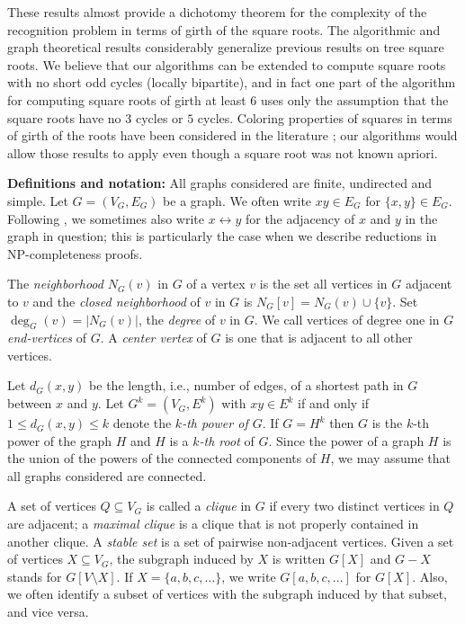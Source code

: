 \documentclass[proceedings]{stacs}
\newlength{\ai}
\begin{document}
These results almost provide a dichotomy theorem for the complexity
of the recognition problem in terms of girth of the square roots.
The algorithmic and graph theoretical results considerably
generalize previous results on tree square roots.
We believe that our algorithms can be extended to
compute square roots with no short odd cycles (locally bipartite),
and in fact one part of the algorithm for computing square
roots of girth at least $6$ uses only the assumption that
the square roots have no $3$ cycles or $5$ cycles.
Coloring properties of squares in terms of girth of the roots
have been considered in the literature \cite{AloMoh,CraKim,Havet};
our algorithms would allow those results to apply even
though a square root was not known apriori.

{\bf Definitions and notation:}
All graphs considered are finite, undirected and simple. Let $G=(V_G, E_G)$ be a graph.
We often write $xy\in E_G$ for $\{x,y\}\in E_G$. Following \cite{MotSud1994,LauCor2004}, we sometimes
also write $x\leftrightarrow y$ for the adjacency of $x$ and $y$ in the graph in question; this
is particularly the case when we describe reductions in NP-completeness proofs.

The \emph{neighborhood} $N_G(v)$ in $G$
of a vertex $v$ is the set all vertices in $G$ adjacent to $v$ and the
\emph{closed neighborhood} of $v$ in $G$ is $N_G[v] = N_G(v)\cup\{v\}$. Set $\deg_G(v)=|N_G(v)|$,
the \emph{degree} of $v$ in $G$. We call vertices of degree one in $G$ \emph{end-vertices}
of $G$. A \emph{center vertex} of $G$ is one that is adjacent to all other vertices.

Let $d_G(x,y)$ be the length, i.e., number of edges, of a shortest path in $G$ between
$x$ and $y$. Let $G^k=(V_G,E^k)$ with $xy \in E^k$ if and only if $1\le d_G(x,y) \le k$ denote
the {\em $k$-th power of $G$}. If $G=H^k$ then $G$ is the $k$-th power of the graph $H$ and
$H$ is a \emph{$k$-th root} of $G$. Since the power of a graph $H$ is the union of the powers
of the connected components of $H$, we may assume that all graphs considered are connected.

A set of vertices $Q\subseteq V_G$ is called a \emph{clique} in $G$ if every two
distinct vertices in $Q$ are adjacent; a \emph{maximal clique} is a clique that is not
properly contained in another clique. A \emph{stable set} is a set of pairwise non-adjacent
vertices. Given a set of vertices $X\subseteq V_G$, the subgraph induced by $X$ is written
$G[X]$ and $G-X$ stands for $G[V\setminus X]$. If $X=\{a, b, c, \ldots\}$, we write
$G[a, b, c, \ldots]$ for $G[X]$. Also, we often identify a subset of vertices with the
subgraph induced by that subset, and vice versa.
\end{document}
